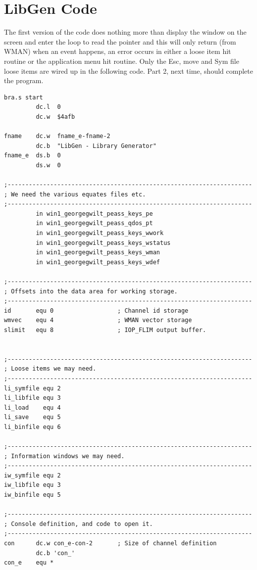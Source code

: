 \section{LibGen Code}

The first version of the code does nothing more than display the
    window on the screen and enter the loop to read the pointer and this will
	    only return (from WMAN) when an event happens,
    an error occurs in either a loose item hit routine or the application menu
    hit routine. Only the Esc, move and Sym file loose items are wired up
    in the following code. Part 2, next time, should complete the
    program.

\begin{lstlisting}[firstnumber=1,caption={LibGen\_asm - Part 1}]
         bra.s start
         dc.l  0
         dc.w  $4afb

fname    dc.w  fname_e-fname-2
         dc.b  "LibGen - Library Generator"
fname_e  ds.b  0
         ds.w  0

;---------------------------------------------------------------------
; We need the various equates files etc.
;---------------------------------------------------------------------
         in win1_georgegwilt_peass_keys_pe
         in win1_georgegwilt_peass_qdos_pt
         in win1_georgegwilt_peass_keys_wwork
         in win1_georgegwilt_peass_keys_wstatus
         in win1_georgegwilt_peass_keys_wman
         in win1_georgegwilt_peass_keys_wdef

;---------------------------------------------------------------------
; Offsets into the data area for working storage.
;---------------------------------------------------------------------
id       equ 0                  ; Channel id storage
wmvec    equ 4                  ; WMAN vector storage
slimit   equ 8                  ; IOP_FLIM output buffer.


;---------------------------------------------------------------------
; Loose items we may need.
;---------------------------------------------------------------------
li_symfile equ 2
li_libfile equ 3
li_load    equ 4
li_save    equ 5
li_binfile equ 6

;---------------------------------------------------------------------
; Information windows we may need.
;---------------------------------------------------------------------
iw_symfile equ 2
iw_libfile equ 3
iw_binfile equ 5

;---------------------------------------------------------------------
; Console definition, and code to open it.
;---------------------------------------------------------------------
con      dc.w con_e-con-2       ; Size of channel definition
         dc.b 'con_'
con_e    equ *


\end{lstlisting}
